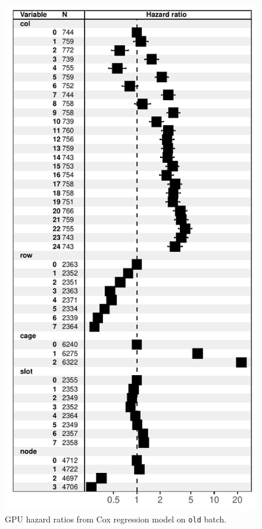 \begin{figure}
  \centering
  \includegraphics[width=0.8\columnwidth]{figs/cox_o001.pdf}
  \caption{GPU hazard ratios from Cox regression model on {\tt old}
    batch.}
\end{figure}
